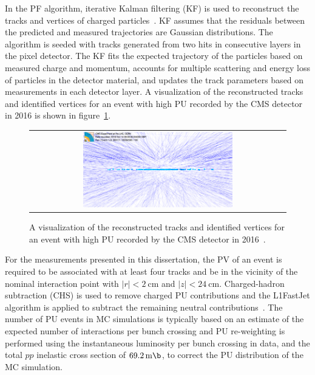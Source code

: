 In the PF algorithm, iterative Kalman filtering (KF) is used to reconstruct the tracks and vertices of charged particles~\cite{Sirunyan:2270046}.
KF assumes that the residuals between the predicted and measured trajectories are Gaussian distributions.
The algorithm is seeded with tracks generated from two hits in consecutive layers in the pixel detector.
The KF fits the expected trajectory of the particles based on measured charge and momentum, accounts for multiple scattering and energy loss of particles in the detector material, and updates the track parameters based on measurements in each detector layer.
A visualization of the reconstructed tracks and identified vertices for an event with high PU recorded by the CMS detector in 2016 is shown in figure~\ref{Pileup}.
\begin{figure}[htb]
  \begin{center}
    \begin{tabular}{c}
        \includegraphics[width=0.6\textwidth]{fig_Event_Reconstruction/Pileup.png}
    \end{tabular}
    \caption{A visualization of the reconstructed tracks and identified vertices for an event with high PU recorded by the CMS detector in 2016~\cite{Collaboration:2231915}.
            }
    \label{Pileup}
  \end{center}
\end{figure}

For the measurements presented in this dissertation, the PV of an event is required to be associated with at least four tracks and be in the vicinity of the nominal interaction point with $\vert r \vert < \SI{2}{\cm}$ and $\vert z \vert < \SI{24}{\cm}$. 
Charged-hadron subtraction (CHS) is used to remove charged PU contributions and the L1FastJet algorithm is applied to subtract the remaining neutral contributions~\cite{bib:JME18001}.
The number of PU events in MC simulations is typically based on an estimate of the expected number of interactions per bunch crossing and PU re-weighting is performed using the instantaneous luminosity per bunch crossing in data, and the total $pp$ inelastic cross section of $\SI{69.2}{\milli \b}$, to correct the PU distribution of the MC simulation.

